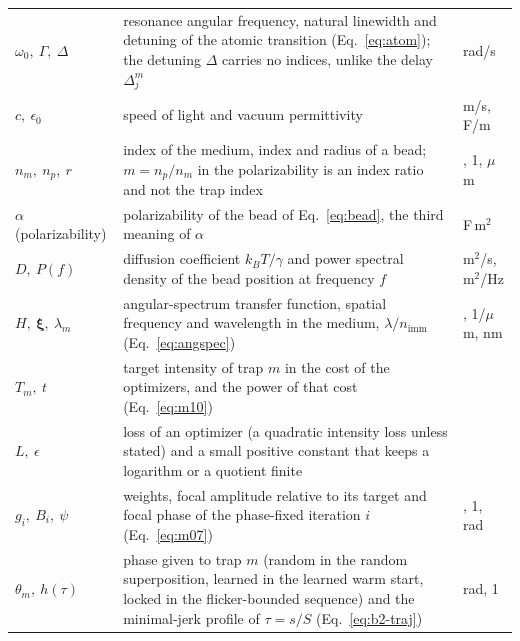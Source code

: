 \begin{longtable}{@{}>{\raggedright\arraybackslash}p{} >{\raggedright\arraybackslash}p{} >{\raggedright\arraybackslash}p{}@{}}
$\omega_0,\ \Gamma,\ \Delta$ & resonance angular frequency, natural linewidth and detuning of the atomic transition (Eq.~\eqref{eq:atom}); the detuning $\Delta$ carries no indices, unlike the delay $\Delta_j^m$ & rad/s\\
$c,\ \epsilon_0$ & speed of light and vacuum permittivity & m/s, F/m\\
$n_m,\ n_p,\ r$ & index of the medium, index and radius of a bead; $m=n_p/n_m$ in the polarizability is an index ratio and not the trap index & 1, 1, $\mu$m\\
$\alpha$ (polarizability) & polarizability of the bead of Eq.~\eqref{eq:bead}, the third meaning of $\alpha$ & F\,m$^2$\\
$D,\ P(f)$ & diffusion coefficient $k_BT/\gamma$ and power spectral density of the bead position at frequency $f$ & m$^2$/s, m$^2$/Hz\\
$H,\ \boldsymbol\xi,\ \lambda_m$ & angular-spectrum transfer function, spatial frequency and wavelength in the medium, $\lambda/n_{\mathrm{imm}}$ (Eq.~\eqref{eq:angspec}) & 1, 1/$\mu$m, nm\\
$T_m,\ t$ & target intensity of trap $m$ in the cost of the optimizers, and the power of that cost (Eq.~\eqref{eq:m10}) & 1\\
$L,\ \epsilon$ & loss of an optimizer (a quadratic intensity loss unless stated) and a small positive constant that keeps a logarithm or a quotient finite & 1\\
$g_i,\ B_i,\ \psi$ & weights, focal amplitude relative to its target and focal phase of the phase-fixed iteration $i$ (Eq.~\eqref{eq:m07}) & 1, 1, rad\\
$\theta_m,\ h(\tau)$ & phase given to trap $m$ (random in the random superposition, learned in the learned warm start, locked in the flicker-bounded sequence) and the minimal-jerk profile of $\tau=s/S$ (Eq.~\eqref{eq:b2-traj}) & rad, 1\\
\bottomrule\end{longtable}
\endgroup
